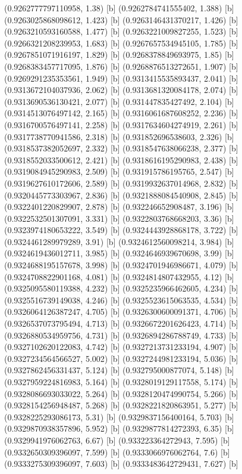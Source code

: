 {{{(0.9262777797110958, 1.38) [b] 
(0.9262784741555402, 1.388) [b] 
(0.9263025868098612, 1.423) [b] 
(0.9263146431370217, 1.426) [b] 
(0.9263210593160588, 1.477) [b] 
(0.9263221009827255, 1.523) [b] 
(0.9266321208239953, 1.683) [b] 
(0.9267657534945105, 1.785) [b] 
(0.9267851071916197, 1.829) [b] 
(0.9268378849693975, 1.85) [b] 
(0.9268383457717095, 1.876) [b] 
(0.9268876513272651, 1.907) [b] 
(0.9269291235353561, 1.949) [b] 
(0.9313415535893437, 2.041) [b] 
(0.9313672104037936, 2.062) [b] 
(0.9313681320084178, 2.074) [b] 
(0.9313690536130421, 2.077) [b] 
(0.931447835427492, 2.104) [b] 
(0.9314513076497142, 2.165) [b] 
(0.9316061687608252, 2.236) [b] 
(0.9316700576497141, 2.258) [b] 
(0.9317634604274919, 2.261) [b] 
(0.9317738770941586, 2.318) [b] 
(0.931852696538603, 2.326) [b] 
(0.9318537382052697, 2.332) [b] 
(0.9318547638066238, 2.377) [b] 
(0.9318552033500612, 2.421) [b] 
(0.9318616195290983, 2.438) [b] 
(0.9319084945290983, 2.509) [b] 
(0.931915786195765, 2.547) [b] 
(0.9319627610172606, 2.589) [b] 
(0.9319932637014968, 2.832) [b] 
(0.9320445773303967, 2.836) [b] 
(0.9321888084540908, 2.845) [b] 
(0.9322401220829907, 2.878) [b] 
(0.932246652908487, 3.196) [b] 
(0.9322532501307091, 3.331) [b] 
(0.9322803768668203, 3.36) [b] 
(0.9323974180653222, 3.549) [b] 
(0.9324443928868178, 3.722) [b] 
(0.9324461289979289, 3.91) [b] 
(0.9324612560098214, 3.984) [b] 
(0.9324619436012711, 3.985) [b] 
(0.9324646939670698, 3.99) [b] 
(0.9324688195157678, 3.998) [b] 
(0.9324701946986671, 4.079) [b] 
(0.9324708822901168, 4.081) [b] 
(0.9324814807432955, 4.12) [b] 
(0.9325095580119388, 4.232) [b] 
(0.9325235966462605, 4.234) [b] 
(0.9325516739149038, 4.246) [b] 
(0.9325523615063535, 4.534) [b] 
(0.9326064126387247, 4.705) [b] 
(0.9326300600091371, 4.706) [b] 
(0.9326537073795494, 4.713) [b] 
(0.9326672201626423, 4.714) [b] 
(0.9326880534959756, 4.731) [b] 
(0.9326894286788749, 4.733) [b] 
(0.9327102620122083, 4.742) [b] 
(0.9327213731233194, 4.907) [b] 
(0.9327234564566527, 5.002) [b] 
(0.9327244981233194, 5.036) [b] 
(0.9327862456331437, 5.124) [b] 
(0.932795000877074, 5.148) [b] 
(0.9327959224816983, 5.164) [b] 
(0.9328019129117558, 5.174) [b] 
(0.9328086693033022, 5.264) [b] 
(0.9328120474990754, 5.266) [b] 
(0.9328154256948487, 5.268) [b] 
(0.9328221820863951, 5.277) [b] 
(0.9328225293086173, 5.31) [b] 
(0.9329837156400164, 5.703) [b] 
(0.9329870938357896, 5.952) [b] 
(0.9329877814272393, 6.35) [b] 
(0.9329941976062763, 6.67) [b] 
(0.933223364272943, 7.595) [b] 
(0.9332650309396097, 7.599) [b] 
(0.9333066976062764, 7.6) [b] 
(0.9333275309396097, 7.603) [b] 
(0.9333483642729431, 7.627) [b] 
}}}
